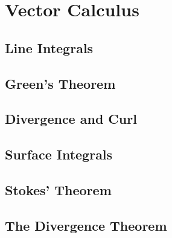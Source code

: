 \chapter{Vector Calculus}

\section{Line Integrals}

\section{Green's Theorem}

\section{Divergence and Curl}

\section{Surface Integrals}

\section{Stokes' Theorem}

\section{The Divergence Theorem}
